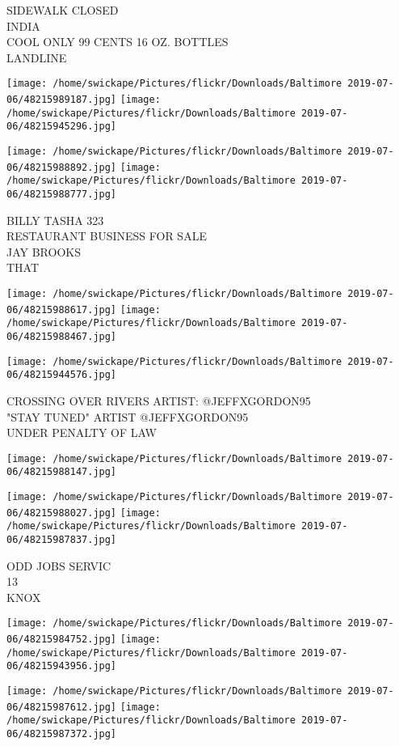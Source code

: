 \documentclass[10pt,letterpaper]{article}
\begin{document}
SIDEWALK CLOSED\\
INDIA\\
COOL ONLY 99 CENTS 16 OZ. BOTTLES\\
LANDLINE
\pagebreak

\texttt{[image: /home/swickape/Pictures/flickr/Downloads/Baltimore 2019-07-06/48215989187.jpg]}
\texttt{[image: /home/swickape/Pictures/flickr/Downloads/Baltimore 2019-07-06/48215945296.jpg]}

\texttt{[image: /home/swickape/Pictures/flickr/Downloads/Baltimore 2019-07-06/48215988892.jpg]}
\texttt{[image: /home/swickape/Pictures/flickr/Downloads/Baltimore 2019-07-06/48215988777.jpg]}

BILLY TASHA 323\\
RESTAURANT BUSINESS FOR SALE\\
JAY BROOKS\\
THAT
\pagebreak

\texttt{[image: /home/swickape/Pictures/flickr/Downloads/Baltimore 2019-07-06/48215988617.jpg]}
\texttt{[image: /home/swickape/Pictures/flickr/Downloads/Baltimore 2019-07-06/48215988467.jpg]}

\texttt{[image: /home/swickape/Pictures/flickr/Downloads/Baltimore 2019-07-06/48215944576.jpg]}

CROSSING OVER RIVERS ARTIST: @JEFFXGORDON95\\
"STAY TUNED" ARTIST @JEFFXGORDON95\\
UNDER PENALTY OF LAW
\pagebreak

\texttt{[image: /home/swickape/Pictures/flickr/Downloads/Baltimore 2019-07-06/48215988147.jpg]}

\vspace{0.25in}
\texttt{[image: /home/swickape/Pictures/flickr/Downloads/Baltimore 2019-07-06/48215988027.jpg]}
\texttt{[image: /home/swickape/Pictures/flickr/Downloads/Baltimore 2019-07-06/48215987837.jpg]}

ODD JOBS SERVIC\\
13\\
KNOX
\pagebreak

\texttt{[image: /home/swickape/Pictures/flickr/Downloads/Baltimore 2019-07-06/48215984752.jpg]}
\texttt{[image: /home/swickape/Pictures/flickr/Downloads/Baltimore 2019-07-06/48215943956.jpg]}

\texttt{[image: /home/swickape/Pictures/flickr/Downloads/Baltimore 2019-07-06/48215987612.jpg]}
\texttt{[image: /home/swickape/Pictures/flickr/Downloads/Baltimore 2019-07-06/48215987372.jpg]}
\end{document}
